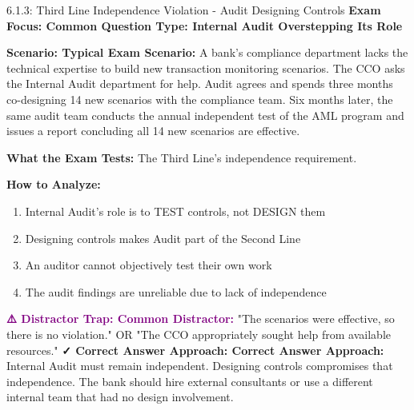 \documentclass[11pt,a4paper]{beamer}
\newcommand{\examfocus}[1]{\textcolor{orange!80!black}{\textbf{Exam Focus: #1}}}
\newcommand{\trap}[1]{\textcolor{purple}{\textbf{⚠️ Distractor Trap: #1}}}
\newcommand{\correct}[1]{\textcolor{green!50!black}{\textbf{✓ Correct Answer Approach: #1}}}
\newcommand{\scenario}[1]{\textcolor{blue!70!black}{\textbf{Scenario: #1}}}
\begin{document}
	\begin{frame}{6.1.3: Third Line Independence Violation - Audit Designing Controls}
		\examfocus{Common Question Type: Internal Audit Overstepping Its Role}
		
		\scenario{Typical Exam Scenario:}
		A bank's compliance department lacks the technical expertise to build new transaction monitoring scenarios. The CCO asks the Internal Audit department for help. Audit agrees and spends three months co-designing 14 new scenarios with the compliance team. Six months later, the same audit team conducts the annual independent test of the AML program and issues a report concluding all 14 new scenarios are effective.
		
		\textbf{What the Exam Tests:} The Third Line's independence requirement.
		
		\textbf{How to Analyze:}
		\begin{enumerate}
			\item Internal Audit's role is to TEST controls, not DESIGN them
			\item Designing controls makes Audit part of the Second Line
			\item An auditor cannot objectively test their own work
			\item The audit findings are unreliable due to lack of independence
		\end{enumerate}
		
		\trap{Common Distractor:} "The scenarios were effective, so there is no violation." OR "The CCO appropriately sought help from available resources."
		\correct{Correct Answer Approach:} Internal Audit must remain independent. Designing controls compromises that independence. The bank should hire external consultants or use a different internal team that had no design involvement.
	\end{frame}
	
\end{document}
